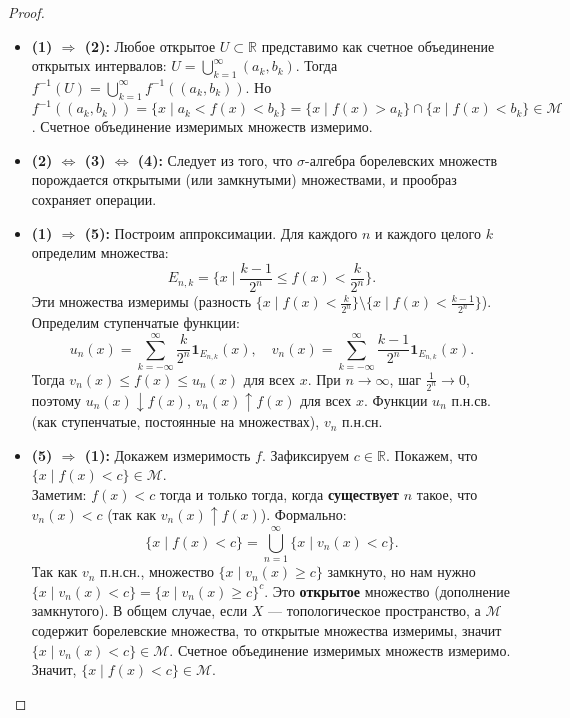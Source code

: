 \documentclass[a4paper, 12pt]{article}
\newcommand{\R}{\mathbb{R}}
\newcommand{\1}{\mathbf{1}}
\begin{document}
\begin{proof}
    \hfill
    \begin{itemize}
        \item \textbf{(1) $\Rightarrow$ (2):} Любое открытое $U \subset \R$ представимо как счетное объединение открытых интервалов: $U = \bigcup_{k=1}^{\infty} (a_k, b_k)$. Тогда $f^{-1}(U) = \bigcup_{k=1}^{\infty} f^{-1}((a_k, b_k))$. Но $f^{-1}((a_k, b_k)) = \{x \mid a_k < f(x) < b_k\} = \{x \mid f(x) > a_k\} \cap \{x \mid f(x) < b_k\} \in \mathcal{M}$. Счетное объединение измеримых множеств измеримо.
        \item \textbf{(2) $\Leftrightarrow$ (3) $\Leftrightarrow$ (4):} Следует из того, что $\sigma$-алгебра борелевских множеств порождается открытыми (или замкнутыми) множествами, и прообраз сохраняет операции.
        \item \textbf{(1) $\Rightarrow$ (5):} Построим аппроксимации. Для каждого $n$ и каждого целого $k$ определим множества:
        \[
        E_{n,k} = \{x \mid \frac{k-1}{2^n} \leq f(x) < \frac{k}{2^n} \}.
        \]
        Эти множества измеримы (разность $\{x \mid f(x) < \frac{k}{2^n}\} \setminus \{x \mid f(x) < \frac{k-1}{2^n}\}$). Определим ступенчатые функции:
        \[
        u_n(x) = \sum_{k=-\infty}^{\infty} \frac{k}{2^n} \1_{E_{n,k}}(x), \quad v_n(x) = \sum_{k=-\infty}^{\infty} \frac{k-1}{2^n} \1_{E_{n,k}}(x).
        \]
        Тогда $v_n(x) \leq f(x) \leq u_n(x)$ для всех $x$. При $n \to \infty$, шаг $\frac{1}{2^n} \to 0$, поэтому $u_n(x) \downarrow f(x)$, $v_n(x) \uparrow f(x)$ для всех $x$. Функции $u_n$ п.н.св. (как ступенчатые, постоянные на множествах), $v_n$ п.н.сн.
        \item \textbf{(5) $\Rightarrow$ (1):} Докажем измеримость $f$. Зафиксируем $c \in \R$. Покажем, что $\{x \mid f(x) < c\} \in \mathcal{M}$. \\
        Заметим: $f(x) < c$ тогда и только тогда, когда \textbf{существует} $n$ такое, что $v_n(x) < c$ (так как $v_n(x) \uparrow f(x)$). Формально:
        \[
        \{x \mid f(x) < c\} = \bigcup_{n=1}^{\infty} \{x \mid v_n(x) < c\}.
        \]
        Так как $v_n$ п.н.сн., множество $\{x \mid v_n(x) \geq c\}$ замкнуто, но нам нужно $\{x \mid v_n(x) < c\} = \{x \mid v_n(x) \geq c\}^c$. Это \textbf{открытое} множество (дополнение замкнутого). В общем случае, если $X$ — топологическое пространство, а $\mathcal{M}$ содержит борелевские множества, то открытые множества измеримы, значит $\{x \mid v_n(x) < c\} \in \mathcal{M}$. Счетное объединение измеримых множеств измеримо. Значит, $\{x \mid f(x) < c\} \in \mathcal{M}$.
    \end{itemize}
\end{proof}
\end{document}
